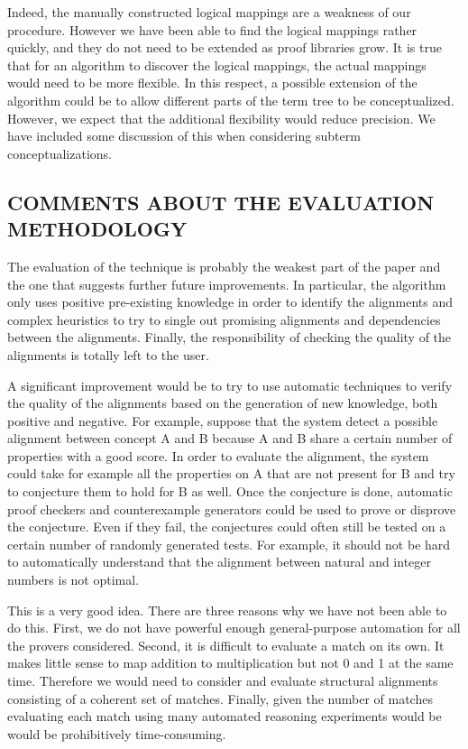 \documentclass[]{scrartcl}
\begin{document}
Indeed, the manually constructed logical mappings are a weakness of our 
procedure.
However we have been able to find the logical mappings rather quickly, and they 
do not need to be extended as proof libraries grow.
It is true that for an algorithm to discover the logical mappings, the actual 
mappings would need to be more flexible.
In this respect, a possible extension of the algorithm could be to allow 
different parts of the term tree to be conceptualized.
However, we expect that the additional flexibility would reduce precision. We 
have included some discussion of this when considering
subterm conceptualizations.

\subsection*{COMMENTS ABOUT THE EVALUATION METHODOLOGY}

\begin{leftbar}
The evaluation of the technique is probably the weakest part of the paper and 
the one that suggests further future improvements. In particular, the algorithm 
only uses positive pre-existing knowledge in order to identify the alignments 
and complex heuristics to try to single out promising alignments and 
dependencies between the alignments. Finally, the responsibility of checking 
the quality of the alignments is totally left to the user.

A significant improvement would be to try to use automatic techniques to verify 
the quality of the alignments based on the generation of new knowledge, both 
positive and negative. For example, suppose that the system detect a possible 
alignment between concept A and B because A and B share a certain number of 
properties with a good score. In order to evaluate the alignment, the system 
could take for example all the properties on A that are not present for B and 
try to conjecture them to hold for B as well. Once the conjecture is done, 
automatic proof checkers and counterexample generators could be used to prove 
or disprove the conjecture. Even if they fail, the conjectures could often 
still be tested on a certain number of randomly generated tests. For example, 
it should not be hard to automatically understand that the alignment between 
natural and integer numbers is not optimal.
\end{leftbar}

This is a very good idea. There are three reasons why we have not been able to 
do this.
First, we do not have powerful enough general-purpose automation for all the 
provers considered.
Second, it is difficult to evaluate a match on its own. It makes little sense 
to map addition to multiplication but not 0 and 1 at the same time. Therefore 
we would need to consider and evaluate structural alignments consisting of a 
coherent set of matches.
Finally, given the number of matches evaluating each match using many  
automated reasoning experiments would be would be prohibitively time-consuming.
\end{document}

